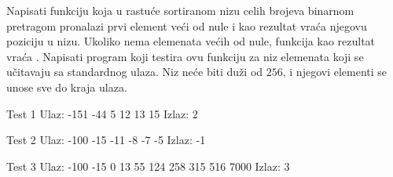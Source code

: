 \begin{Answer}[ref=406]
\end{Answer}
\begin{Exercise}[label=407]
Napisati funkciju koja u rastuće sortiranom nizu celih brojeva
binarnom pretragom pronalazi prvi element veći od nule i kao
rezultat vraća njegovu poziciju u nizu. Ukoliko nema elemenata
većih od nule, funkcija kao rezultat vraća . Napisati
program koji testira ovu funkciju za niz elemenata koji se
učitavaju sa standardnog ulaza. Niz neće biti duži od
$256$, i njegovi elementi se unose sve do kraja ulaza.

\begin{minitest}
\begin{test}{Test 1}
Ulaz:  -151 -44 5 
       12 13 15
Izlaz: 2
\end{test}
\end{minitest}
\begin{minitest}
\begin{test}{Test 2}
Ulaz:  -100 -15 -11 
       -8 -7 -5
Izlaz: -1
\end{test}
\end{minitest}
\begin{minitest}
\begin{test}{Test 3}
Ulaz:  -100 -15 0 13 
       55 124 258 
       315 516 7000
Izlaz: 3
\end{test}
\end{minitest}


\end{Exercise}
\begin{Answer}[ref=407]
\end{Answer}
